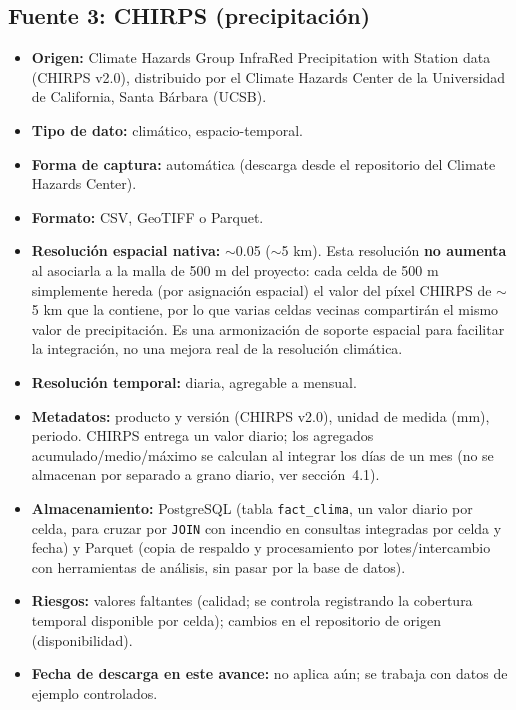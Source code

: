\documentclass[11pt,a4paper]{article}
\begin{document}
\subsection{Fuente 3: CHIRPS (precipitaci\'on)}
\begin{itemize}
    \item \textbf{Origen:} Climate Hazards Group InfraRed Precipitation with Station data (CHIRPS v2.0), distribuido por el Climate Hazards Center de la Universidad de California, Santa B\'arbara (UCSB).
    \item \textbf{Tipo de dato:} clim\'atico, espacio-temporal.
    \item \textbf{Forma de captura:} autom\'atica (descarga desde el repositorio del Climate Hazards Center).
    \item \textbf{Formato:} CSV, GeoTIFF o Parquet.
    \item \textbf{Resoluci\'on espacial nativa:} $\sim$0.05\textdegree{} ($\sim$5 km). Esta resoluci\'on \textbf{no aumenta} al asociarla a la malla de 500 m del proyecto: cada celda de 500 m simplemente hereda (por asignaci\'on espacial) el valor del p\'ixel CHIRPS de $\sim$5 km que la contiene, por lo que varias celdas vecinas compartir\'an el mismo valor de precipitaci\'on. Es una armonizaci\'on de soporte espacial para facilitar la integraci\'on, no una mejora real de la resoluci\'on clim\'atica.
    \item \textbf{Resoluci\'on temporal:} diaria, agregable a mensual.
    \item \textbf{Metadatos:} producto y versi\'on (CHIRPS v2.0), unidad de medida (mm), periodo. CHIRPS entrega un valor diario; los agregados acumulado/medio/m\'aximo se calculan al integrar los d\'ias de un mes (no se almacenan por separado a grano diario, ver secci\'on~4.1).
    \item \textbf{Almacenamiento:} PostgreSQL (tabla \texttt{fact\_clima}, un valor diario por celda, para cruzar por \texttt{JOIN} con incendio en consultas integradas por celda y fecha) y Parquet (copia de respaldo y procesamiento por lotes/intercambio con herramientas de an\'alisis, sin pasar por la base de datos).
    \item \textbf{Riesgos:} valores faltantes (calidad; se controla registrando la cobertura temporal disponible por celda); cambios en el repositorio de origen (disponibilidad).
    \item \textbf{Fecha de descarga en este avance:} no aplica a\'un; se trabaja con datos de ejemplo controlados.
\end{itemize}
\end{document}
